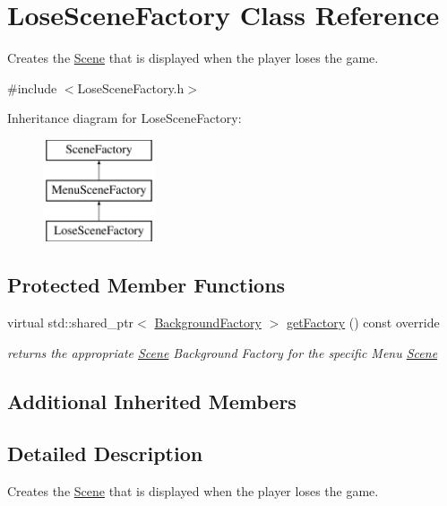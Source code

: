 \hypertarget{class_lose_scene_factory}{}\section{Lose\+Scene\+Factory Class Reference}
\label{class_lose_scene_factory}


Creates the \hyperlink{class_scene}{Scene} that is displayed when the player loses the game.  




{\ttfamily \#include $<$Lose\+Scene\+Factory.\+h$>$}

Inheritance diagram for Lose\+Scene\+Factory\+:\begin{figure}[H]
\begin{center}
\leavevmode
\includegraphics[height=3.000000cm]{dd/d0c/class_lose_scene_factory}
\end{center}
\end{figure}
\subsection*{Protected Member Functions}
\begin{DoxyCompactItemize}
\item 
virtual std\+::shared\+\_\+ptr$<$ \hyperlink{class_background_factory}{Background\+Factory} $>$ \hyperlink{class_lose_scene_factory_adfe18ba674cdd988bb78e3cd3218796f}{get\+Factory} () const override
\begin{DoxyCompactList}\small\item\em returns the appropriate \hyperlink{class_scene}{Scene} Background Factory for the specific Menu \hyperlink{class_scene}{Scene} \end{DoxyCompactList}\end{DoxyCompactItemize}
\subsection*{Additional Inherited Members}


\subsection{Detailed Description}
Creates the \hyperlink{class_scene}{Scene} that is displayed when the player loses the game. 

